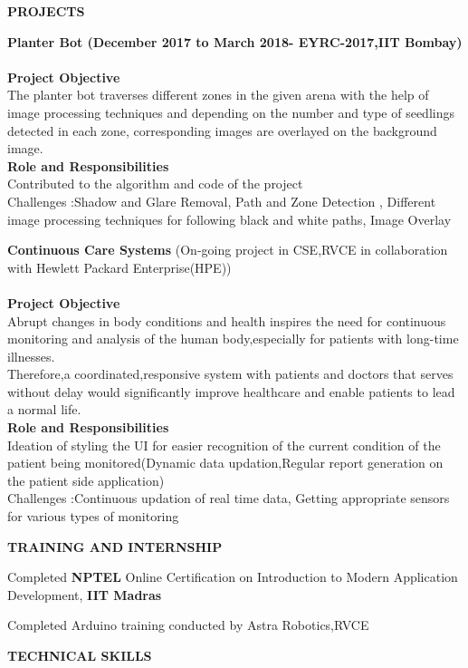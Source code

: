 \documentclass[letterpaper,11pt,oneside]{article}
\begin{document}
\vspace{5ex}

\noindent\textbf{{\normalsize PROJECTS}} \begin{enumerate}
	\item 
	\small {\textbf{Planter Bot (December 2017 to March 2018- EYRC-2017,IIT Bombay)}\\\\
		\textbf{Project Objective}\\
		The planter bot traverses different zones in the given arena with the help of image processing techniques
		and depending on the number and type of seedlings detected in each zone, corresponding images are overlayed on the background image.\\
		\textbf{Role and Responsibilities}\\
		Contributed to the algorithm and code of the project\\
		Challenges :Shadow and Glare Removal, Path and Zone Detection , Different image processing techniques for following black and white paths, Image Overlay
		
		\item \textbf{Continuous Care Systems}
		(On-going project in CSE,RVCE in collaboration with Hewlett Packard Enterprise(HPE))\\\\
		\textbf{Project Objective}\\
		Abrupt changes in body conditions and health inspires the need for continuous monitoring and analysis of the human body,especially for patients with long-time illnesses.\\
		Therefore,a coordinated,responsive system with patients and doctors that serves without delay would significantly improve healthcare and enable patients to lead a normal life.\\
		\textbf{Role and Responsibilities}\\
		Ideation of styling the UI for easier recognition of the current condition of the patient being monitored(Dynamic data updation,Regular report generation on the patient side application)\\
		Challenges :Continuous updation of real time data, Getting appropriate sensors for various types of monitoring
	}
	
\end{enumerate}

\vspace{2ex}

\noindent\textbf{{\normalsize  TRAINING AND INTERNSHIP}} \begin{itemize}
	\small {\item 	Completed \textbf{NPTEL} Online Certification on Introduction to Modern Application Development, \textbf{IIT Madras}
		\item	Completed Arduino training conducted by Astra Robotics,RVCE
	}
\end{itemize}
\vspace{2ex}
\noindent\textbf{{\normalsize  TECHNICAL SKILLS}} 
\end{document}
